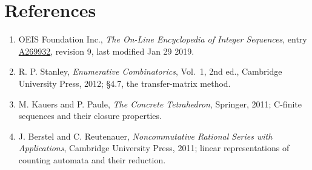 \documentclass[11pt]{article}
\theoremstyle{definition}
\begin{document}
\section{References}

\begin{enumerate}

\item OEIS Foundation Inc., \emph{The On-Line Encyclopedia of Integer Sequences}, entry \href{https://oeis.org/A269932}{A269932}, revision 9, last modified Jan 29 2019.

\item R. P. Stanley, \emph{Enumerative Combinatorics}, Vol.~1, 2nd ed., Cambridge University Press, 2012; \S4.7, the transfer-matrix method.

\item M. Kauers and P. Paule, \emph{The Concrete Tetrahedron}, Springer, 2011; C-finite sequences and their closure properties.

\item J. Berstel and C. Reutenauer, \emph{Noncommutative Rational Series with Applications}, Cambridge University Press, 2011; linear representations of counting automata and their reduction.

\end{enumerate}
\end{document}
